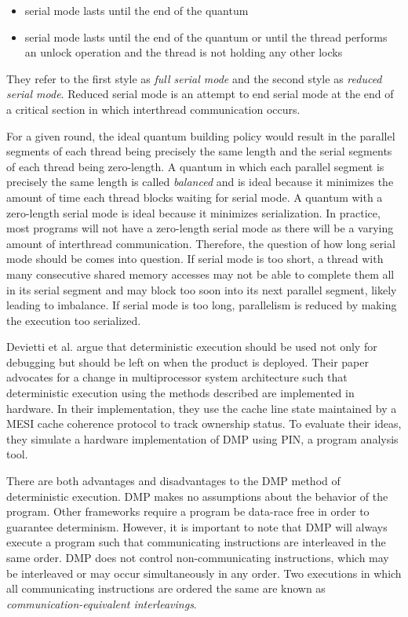 \begin{itemize}
\item serial mode lasts until the end of the quantum

\item serial mode lasts until the end of the quantum or until the
  thread performs an unlock operation and the thread is not holding
  any other locks
\end{itemize}

They refer to the first style as \emph{full serial mode} and the
second style as \emph{reduced serial mode}.  Reduced serial mode is an
attempt to end serial mode at the end of a critical section in which
interthread communication occurs.

For a given round, the ideal quantum building policy would result in
the parallel segments of each thread being precisely the same length
and the serial segments of each thread being zero-length.  A quantum
in which each parallel segment is precisely the same length is called
\emph{balanced} and is ideal because it minimizes the amount of time
each thread blocks waiting for serial mode.  A quantum with a
zero-length serial mode is ideal because it minimizes serialization.
In practice, most programs will not have a zero-length serial mode as
there will be a varying amount of interthread communication.
Therefore, the question of how long serial mode should be comes into
question.  If serial mode is too short, a thread with many consecutive
shared memory accesses may not be able to complete them all in its
serial segment and may block too soon into its next parallel segment,
likely leading to imbalance.  If serial mode is too long, parallelism
is reduced by making the execution too serialized.

Devietti et al. argue that deterministic execution should be used not
only for debugging but should be left on when the product is deployed.
Their paper advocates for a change in multiprocessor system
architecture such that deterministic execution using the methods
described are implemented in hardware.  In their implementation, they
use the cache line state maintained by a MESI cache coherence protocol
to track ownership status.  To evaluate their ideas, they simulate a
hardware implementation of DMP using PIN, a program analysis tool.

There are both advantages and disadvantages to the DMP method of
deterministic execution.  DMP makes no assumptions about the behavior
of the program.  Other frameworks require a program be data-race free
in order to guarantee determinism.  However, it is important to note
that DMP will always execute a program such that communicating
instructions are interleaved in the same order.  DMP does not control
non-communicating instructions, which may be interleaved or may occur
simultaneously in any order.  Two executions in which all
communicating instructions are ordered the same are known as
\emph{communication-equivalent interleavings}.

